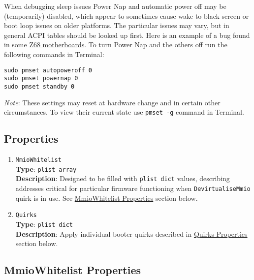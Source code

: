 \documentclass[]{article}
\begin{document}
When debugging sleep issues Power Nap and automatic power off may be (temporarily) disabled,
which appear to sometimes cause wake to black screen or boot loop
issues on older platforms. The particular issues may vary, but in general ACPI tables should be looked up first.
Here is an example of a bug found in some
\href{http://www.insanelymac.com/forum/topic/329624-need-cmos-reset-after-sleep-only-after-login/#entry2534645}{Z68 motherboards}.
To turn Power Nap and the others off run the following commands in Terminal:
\begin{lstlisting}[label=powernap, style=ocbash]
sudo pmset autopoweroff 0
sudo pmset powernap 0
sudo pmset standby 0
\end{lstlisting}

\emph{Note}: These settings may reset at hardware change and in certain other circumstances.
To view their current state use \texttt{pmset -g} command in Terminal.

\subsection{Properties}\label{booterprops}

\begin{enumerate}

\item
  \texttt{MmioWhitelist}\\
  \textbf{Type}: \texttt{plist\ array}\\
  \textbf{Description}: Designed to be filled with \texttt{plist\ dict} values,
  describing addresses critical for particular firmware functioning when
  \texttt{DevirtualiseMmio} quirk is in use. See \hyperref[booterpropsmmio]{MmioWhitelist Properties}
  section below.

\item
  \texttt{Quirks}\\
  \textbf{Type}: \texttt{plist\ dict}\\
  \textbf{Description}: Apply individual booter quirks described
  in \hyperref[booterpropsquirks]{Quirks Properties} section below.

\end{enumerate}

\subsection{MmioWhitelist Properties}\label{booterpropsmmio}
\end{document}
